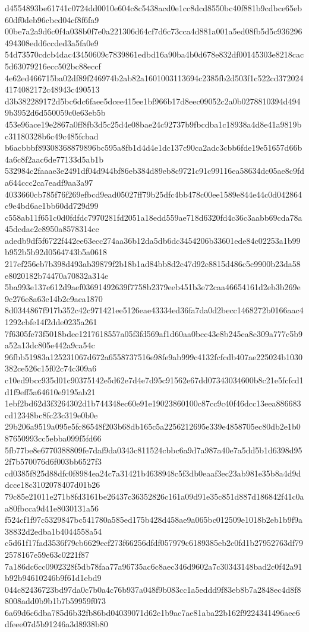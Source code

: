 {d4554893be61741c0724dd0010e604c8c5438acd0e1cc8dcd8550bc40f881b9cdbce65eb60df0deb96cbcd04cf8f6fa9
00be7a2a9d6c0f4a038b0f7e0a221306d64cf7d6c73cca4d881a001a5ed08fb5d5c936296494308edd6ccded3a5fa0e9
54d73570cdcb4dac43450609c7839861edbd16a90ba4b0d678e832df00145303e8218cac5d63079216ecc502bc88eccf
4e62ed466715ba02df89f246974b2ab82a1601003113694c2385fb2d503f1c522cd3720244174082172c48943c490513
d3b382289172d5bc6dc6faee5dcee415ee1bf966b17d8eec09052c2a0b0278810394d4949b3952d6d550059c0e63eb5b
453e96ace19e2867a0ff8fb3d5c25d4e08bae24c92737b9fbcdba1c18938a4d8e41a9819bc31180328b6c49c485fcbad
b6acbbbf89308368879896bc595a8fb1d4d4e1dc137c90ca2adc3cbb6fde19e51657d66b4a6c8f2aac6de77133d5ab1b
532984c2faaae3e2491df04d944bf86eb384d89eb8c9721c91c99116ea58634dc05ae8c9fda644ccc2ca7eadf9aa3a97
4033660cb785f76f269efbcd9ead05027ff79b25dfc4bb478c00ee1589e844e44c0d042864c9e4bd6ae1bb60dd729d99
c558ab11f651c0d0fdfdc7970281fd2051a18edd559ae718d6320fd4c36c3aabb69cda78a45dcdac2c8950a8578314ce
adedb9df5f6722f442ee63ecc274aa36b12da5db6dc3454206b33601ede84c02253a1b99b952b5b92d0564743b5a0618
217ef256eb7b398d493ab39879f2b18b1ad84bb8d2c47d92c8815d486c5c9900b23da58e8020182b74470a70832a314e
5ba993e137e612d9aef03691492639f7758b2379eeb451b3e72caa46654161d2eb3b269e9c276e8a63e14b2c9aea1870
8d0344867f917b352c42c971421ee5126eae43334ed36fa7da0d2becc1468272b0166aac41292cbfe14f2dde0235a261
7f6305fe73f5018bdee1217618557a05f3fd569af1d60aa0bcc43e8b245ea8c309a777c5b9a52a13dc805e442a9ca54c
96fbb51983a125231067d672a6558737516e98fe9ab999c4132fcfcdb407ae225024b1030382ce526c15f02c74c309a6
c10ed9bcc935d01c90375142e5d62e7d4e7d95c91562e67dd07343034600b8c21e5fcfcd1d1f9eff5a64610e9195ab21
1ebf2bd62d3f3264302d1b744348ec60e91e19023860100c87cc9c40f46dcc13eea886683cd12348bc8fc23c319e0b0e
29b206a9519a095e5fc86548f203b68db165c5a2256212695e339e4858705ec80db2e1b087650993cc5ebba099f5fd66
5fb77be8e6770388809fe7daf9da0343c811524cbbc6a9d7a987a40e7a5dd5b1d6398d952f7b570076d6f003bb6527f3
cd0385f825d88dfc0f8984ea24c7a31421b4638948c5f3db0eaaf3ec23ab981e35b8a4d9ddcce18c3102078407d01b26
79c85e21011e271b8fd3161be26437c36352826c161a09d91e35c851d887d186842f41c0aa80fbcca9d41e8030131a56
f524cf1f97c5329847bc541780a585ed175b428d458ae9a065bc012509e1018b2eb1b9f9a38832d2edba1b4044558a54
c5d61f17fad3536f79cb6629ecf273f66256dfdf057979c6189385eb2c0fd1b27952763df792578167e59e63c0221f87
7a186dc6cc0902328f5db78faa77a96735ac6c8aec346d9602a7c30343148bad2c0f42a91b92b94610246b9f61d1ebd9
044c82436723bd97da0c7b0a4c76b937a048f9b083cc1a5eddd9f83eb8b7a2848ec4d8f88008add0b9b1b7b59959f073
6a69d6c6dba785d6b32fb86bd04039071d62e1b9ac7ae81aba22b162f9224341496aee6dfeee07d5b91246a3d8938b80
}
